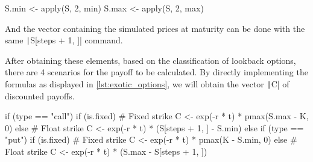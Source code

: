 \begin{Rminted}
S.min <- apply(S, 2, min)
S.max <- apply(S, 2, max)
\end{Rminted}

And the vector containing the simulated prices at maturity can be done with the same \texttt|S[steps + 1, ]| command.

After obtaining these elements, based on the classification of lookback options, there are 4 scenarios for the payoff to be calculated. By directly implementing the formulas as displayed in \ref{lst:exotic_options}, we will obtain the vector \texttt|C| of discounted payoffs.

\begin{Rminted}
if (type == "call") {
    if (is.fixed) { # Fixed strike
        C <- exp(-r * t) * pmax(S.max - K, 0)
    } else { # Float strike
        C <- exp(-r * t) * (S[steps + 1, ] - S.min)
    }
} else if (type == "put") {
    if (is.fixed) { # Fixed strike
        C <- exp(-r * t) * pmax(K - S.min, 0)
    } else { # Float strike
        C <- exp(-r * t) * (S.max - S[steps + 1, ])
    }
}
\end{Rminted}

\newpage